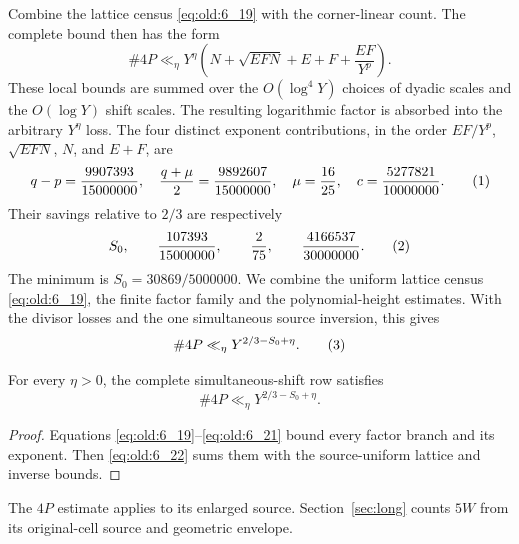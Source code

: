 Combine the lattice census \eqref{eq:old:6_19} with the corner-linear
count.  The complete bound then has the form
\[
 \#4P\ll_\eta Y^\eta\left(N+\sqrt{EFN}+E+F+\frac{EF}{Y^p}\right).
\]
These local bounds are summed over the \(O(\log^4Y)\) choices of dyadic
scales and the \(O(\log Y)\) shift scales.  The resulting logarithmic
factor is absorbed into the arbitrary \(Y^\eta\) loss.
The four distinct exponent contributions, in the order
\(EF/Y^p\), \(\sqrt{EFN}\), \(N\), and \(E+F\), are
\[
 q-p=\frac{9907393}{15000000},\quad
 \frac{q+\mu}{2}=\frac{9892607}{15000000},\quad
 \mu=\frac{16}{25},\quad
 c=\frac{5277821}{10000000}.
\AutoTag{eq:old:6_20}
\]
Their savings relative to $2/3$ are respectively
\[
S_0,\qquad \frac{107393}{15000000},\qquad \frac{2}{75},\qquad
 \frac{4166537}{30000000}.
\AutoTag{eq:old:6_21}
\]
The minimum is $S_0=30869/5000000$.  We combine the uniform lattice census
\eqref{eq:old:6_19}, the finite factor family and the polynomial-height
estimates.  With the divisor losses and the one simultaneous source
inversion, this gives
\[
\#4P\ll_\eta Y^{2/3-S_0+\eta}.
\AutoTag{eq:old:6_22}
\]
\begin{rowproposition}\label{prop:row-4p}
For every \(\eta>0\), the complete simultaneous-shift row satisfies
\[
 \#4P\ll_\eta Y^{2/3-S_0+\eta}.
\]
\end{rowproposition}
\begin{proof}
Equations \eqref{eq:old:6_19}--\eqref{eq:old:6_21} bound every factor
branch and its exponent.  Then \eqref{eq:old:6_22} sums them with the
source-uniform lattice and inverse bounds.
\end{proof}

The $4P$ estimate applies to its enlarged source.  Section~\ref{sec:long}
counts $5W$ from its original-cell source and geometric envelope.
